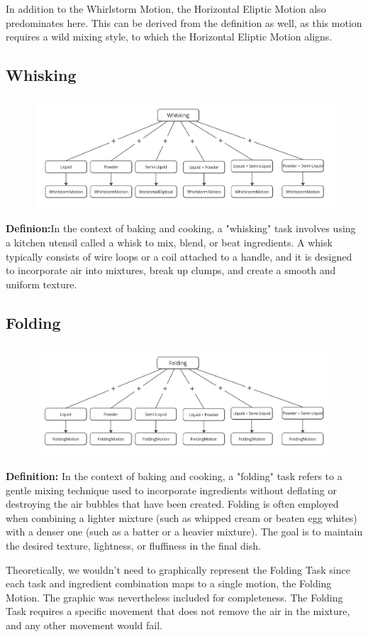 In addition to the Whirlstorm Motion, the Horizontal Eliptic Motion also predominates here. This can be derived from the definition as well, as this motion requires a wild mixing style, to which the Horizontal Eliptic Motion aligns.
\subsection{Whisking}
\begin{figure}[H]
    \includegraphics[scale=0.25]{Graphics/WhiskingDecisionTree.jpg}
    \end{figure}
\textbf{Definion:}In the context of baking and cooking, a "whisking" task involves using a kitchen utensil called a whisk to mix, blend, or beat ingredients. A whisk typically consists of wire loops or a coil attached to a handle, and it is designed to incorporate air into mixtures, break up clumps, and create a smooth and uniform texture.

\subsection{Folding}
\begin{figure}[H]
    \includegraphics[scale=0.25]{Graphics/FoldingDecisionTree.jpg}
    \end{figure}
\textbf{Definition:}
In the context of baking and cooking, a "folding" task refers to a gentle mixing technique used to incorporate ingredients without deflating or destroying the air bubbles that have been created. Folding is often employed when combining a lighter mixture (such as whipped cream or beaten egg whites) with a denser one (such as a batter or a heavier mixture). The goal is to maintain the desired texture, lightness, or fluffiness in the final dish.

Theoretically, we wouldn't need to graphically represent the Folding Task since each task and ingredient combination maps to a single motion, the Folding Motion. The graphic was nevertheless included for completeness. The Folding Task requires a specific movement that does not remove the air in the mixture, and any other movement would fail.
